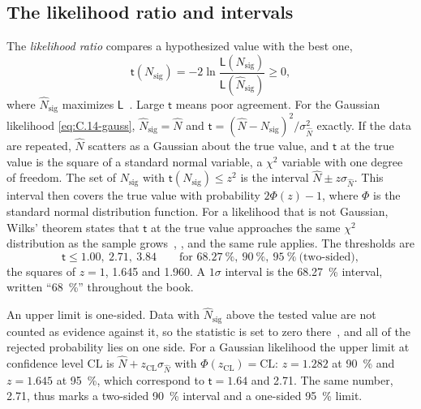 \subsection{The likelihood ratio and intervals}

The \emph{likelihood ratio} compares a hypothesized value with the best one,
\begin{equation}
  \mathsf{t}(N_{\mathrm{sig}}) = -2\ln\frac{\mathsf{L}(N_{\mathrm{sig}})}{\mathsf{L}(\hat N_{\mathrm{sig}})} \ge 0 ,
  \label{eq:C.14-ratio}
\end{equation}
where $\hat N_{\mathrm{sig}}$ maximizes $\mathsf{L}$~\cite[Eq.~(8)]{cowan2011asymptotic}. Large $\mathsf{t}$ means poor agreement. For the Gaussian likelihood \cref{eq:C.14-gauss}, $\hat N_{\mathrm{sig}} = \hat N$ and $\mathsf{t} = (\hat N - N_{\mathrm{sig}})^2/\sigma_{\hat N}^2$ exactly. If the data are repeated, $\hat N$ scatters as a Gaussian about the true value, and $\mathsf{t}$ at the true value is the square of a standard normal variable, a $\chi^2$ variable with one degree of freedom. The set of $N_{\mathrm{sig}}$ with $\mathsf{t}(N_{\mathrm{sig}}) \le z^2$ is the interval $\hat N \pm z\sigma_{\hat N}$. This interval then covers the true value with probability $2\Phi(z) - 1$, where $\Phi$ is the standard normal distribution function. For a likelihood that is not Gaussian, Wilks' theorem states that $\mathsf{t}$ at the true value approaches the same $\chi^2$ distribution as the sample grows~\cite{wilks1938large}, \cite[Sect.~3.1]{cowan2011asymptotic}, and the same rule applies. The thresholds are
\begin{equation}
  \mathsf{t} \le 1.00,\ 2.71,\ 3.84 \qquad \text{for } \SI{68.27}{\percent},\ \SI{90}{\percent},\ \SI{95}{\percent}\ \text{(two-sided)},
  \label{eq:C.14-thresholds}
\end{equation}
the squares of $z = 1$, 1.645 and 1.960. A $1\sigma$ interval is the \SI{68.27}{\percent} interval, written ``\SI{68}{\percent}'' throughout the book.

An upper limit is one-sided. Data with $\hat N_{\mathrm{sig}}$ above the tested value are not counted as evidence against it, so the statistic is set to zero there~\cite[Eq.~(14)]{cowan2011asymptotic}, and all of the rejected probability lies on one side. For a Gaussian likelihood the upper limit at confidence level $\mathrm{CL}$ is $\hat N + z_{\mathrm{CL}}\sigma_{\hat N}$ with $\Phi(z_{\mathrm{CL}}) = \mathrm{CL}$: $z = 1.282$ at \SI{90}{\percent} and $z = 1.645$ at \SI{95}{\percent}, which correspond to $\mathsf{t} = 1.64$ and 2.71. The same number, 2.71, thus marks a two-sided \SI{90}{\percent} interval and a one-sided \SI{95}{\percent} limit.


